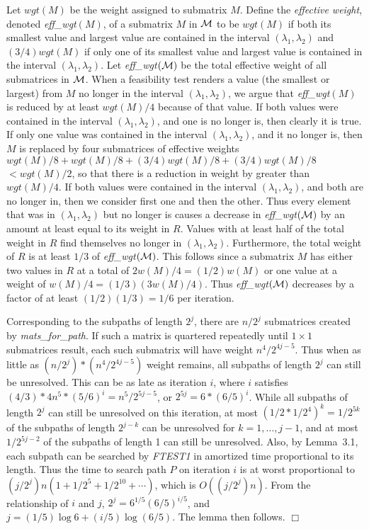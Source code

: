 {{{Let $wgt(M)$ be the weight assigned to submatrix $M$.
Define the {\it effective weight},
denoted {\it eff\_wgt}$(M)$, of a submatrix $M$ in $\cal M$
to be $wgt(M)$ if both its smallest value and largest value
are contained in the interval $(\lambda_1, \lambda_2)$
and $(3/4)wgt(M)$ if only one of its smallest value and largest value
is contained in the interval $(\lambda_1, \lambda_2)$.
Let {\it eff\_wgt}$(\cal M )$ be the total effective weight of all submatrices in $\cal M$.
When a feasibility test renders a value (the smallest or largest)
from $M$ no longer in the interval $(\lambda_1, \lambda_2)$,
we argue that {\it eff\_wgt}$(M)$ is reduced by at least $wgt(M)/4$
because of that value.
If both values were contained in the interval $(\lambda_1, \lambda_2)$,
and one is no longer is, then clearly it is true.
If only one value was contained in the interval $(\lambda_1, \lambda_2)$,
and it no longer is,
then $M$ is replaced by four submatrices of effective weights
$wgt(M)/8 + wgt(M)/8 + (3/4)wgt(M)/8 + (3/4)wgt(M)/8$ $< wgt(M)/2$,
so that there is a reduction in weight by greater than $wgt(M)/4$.
If both values were contained in the interval $(\lambda_1, \lambda_2)$,
and both are no longer in,
then we consider first one and then the other.
Thus every element that was in $(\lambda_1, \lambda_2)$ but no longer is
causes a decrease in {\it eff\_wgt}$(\cal M )$ by an amount
at least equal to its weight in $R$.
Values with at least half of the total weight in $R$
find themselves no longer in $(\lambda_1, \lambda_2)$.
Furthermore, the total weight of $R$ is at least $1/3$ of
{\it eff\_wgt}$(\cal M )$.
This follows since a submatrix $M$ has either two values in $R$
at a total of $2w(M)/4 = (1/2)w(M)$
or one value at a weight of $w(M)/4 = (1/3)(3w(M)/4)$.
Thus {\it eff\_wgt}$(\cal M )$
decreases by a factor of at least $(1/2)(1/3) = 1/6$ per iteration.

Corresponding to the subpaths of length $2^j$,
there are $n/2^j$ submatrices created by {\it mats\_for\_path}.
If such a matrix is quartered repeatedly until $1 \times 1$ submatrices result,
each such submatrix will have weight $n^4/2^{4j-5}$.
Thus when as little as $(n/2^j)*(n^4/2^{4j-5})$ weight remains,
all subpaths of length $2^j$ can still be unresolved.
This can be as late as iteration $i$,
where $i$ satisfies
$(4/3)*4n^5*(5/6)^i = n^5/2^{5j-5}$,
or $2^{5j}=6*(6/5)^i$.
While all subpaths of length $2^j$ can still be unresolved on this iteration,
at most $(1/2*1/2^4)^k = 1/2^{5k}$ of the subpaths of length $2^{j-k}$
can be unresolved for $k= 1, \ldots ,j-1$,
and at most $1/2^{5j-2}$ of the subpaths of length 1 can still be unresolved.
Also, by Lemma~3.1, each subpath can be searched by {\it FTEST1}
in amortized time proportional to its length.
Thus the time to search path $P$ on iteration $i$ is at worst proportional to
$(j/2^j)n(1 + 1/2^5 + 1/2^{10} + \cdots )$,
which is $O((j/2^j)n)$.
From the relationship of $i$ and $j$,
$2^j = 6^{1/5}(6/5)^{i/5}$,
and $j = (1/5)\log 6 + (i/5)\log (6/5)$.
The lemma then follows.
$\Box$
\bigskip

}}}
